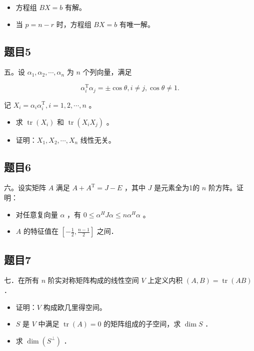 \documentclass{article}
\begin{document}
\begin{itemize}
  \item[（1）] 方程组 \(B X=b\) 有解。
  \item[（2）] 当 \(p=n-r\) 时，方程组 \(B X=b\) 有唯一解。
\end{itemize}

\subsection{题目5}
五。设 \(\alpha_{1}, \alpha_{2}, \cdots, \alpha_{n}\) 为 \(n\) 个列向量，满足

\[
\alpha_{i}^{\mathrm{T}} \alpha_{j}= \pm \cos \theta, i \neq j, \cos \theta \neq 1 .
\]

记 \(X_{i}=\alpha_{i} \alpha_{i}^{\mathrm{T}}, i=1,2, \cdots, n\) 。

\begin{itemize}
  \item[（1）] 求 \(\operatorname{tr}\left(X_{i}\right)\) 和 \(\operatorname{tr}\left(X_{i} X_{j}\right)\) 。
  \item[（2）] 证明：\(X_{1}, X_{2}, \cdots, X_{n}\) 线性无关。
\end{itemize}

\subsection{题目6}
六。设实矩阵 \(A\) 满足 \(A+A^{\mathrm{T}}=J-E\) ，其中 \(J\) 是元素全为1的 \(n\) 阶方阵。证明：

\begin{itemize}
  \item[（1）] 对任意复向量 \(\alpha\) ，有 \(0 \leq \alpha^{H} J \alpha \leq n \alpha^{H} \alpha\) 。
  \item[（2）] \(A\) 的特征值在 \(\left[-\frac{1}{2}, \frac{n-1}{2}\right]\) 之间．
\end{itemize}

\subsection{题目7}
七．在所有 \(n\) 阶实对称矩阵构成的线性空间 \(V\) 上定义内积 \((A, B)=\operatorname{tr}(A B)\) ．

\begin{itemize}
  \item[（1）] 证明：\(V\) 构成欧几里得空间。
  \item[（2）] \(S\) 是 \(V\) 中满足 \(\operatorname{tr}(A)=0\) 的矩阵组成的子空间，求 \(\operatorname{dim} S\) ．
  \item[（3）] 求 \(\operatorname{dim}\left(S^{\perp}\right)\) ．
\end{itemize}
\end{document}
